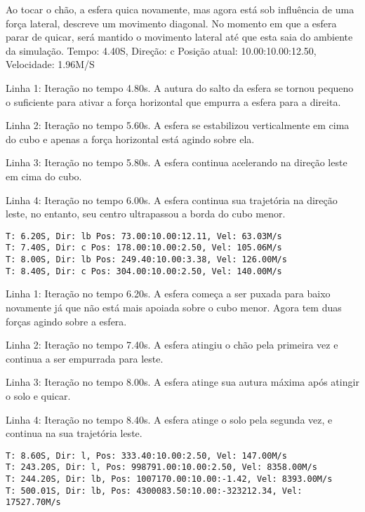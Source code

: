 \documentclass[12pt]{article}
\begin{document}
Ao tocar o chão, a esfera quica novamente, mas agora está sob influência de uma força lateral, descreve um movimento diagonal. No momento em que a esfera parar de quicar, será mantido o movimento lateral até que esta saia do ambiente da simulação.
 Tempo: 4.40S, Direção: c
Posição atual: 10.00:10.00:12.50, Velocidade: 1.96M/S


Linha 1: Iteração no tempo 4.80s. A autura do salto da esfera se tornou pequeno o suficiente para ativar a força horizontal que empurra a esfera para a direita.

Linha 2: Iteração no tempo 5.60s. A esfera se estabilizou verticalmente em cima do cubo e apenas a força horizontal está agindo sobre ela.

Linha 3: Iteração no tempo 5.80s. A esfera continua acelerando  na direção leste em cima do cubo.

Linha 4: Iteração no tempo 6.00s. A esfera continua sua trajetória na direção leste, no entanto, seu centro ultrapassou a borda do cubo menor.

\begin{lstlisting}[frame=single,caption=Esfera se movendo diagonalmente\label{lg:esfera_m3}]
T: 6.20S, Dir: lb Pos: 73.00:10.00:12.11, Vel: 63.03M/s
T: 7.40S, Dir: c Pos: 178.00:10.00:2.50, Vel: 105.06M/s
T: 8.00S, Dir: lb Pos: 249.40:10.00:3.38, Vel: 126.00M/s
T: 8.40S, Dir: c Pos: 304.00:10.00:2.50, Vel: 140.00M/s
\end{lstlisting}

Linha 1: Iteração no tempo 6.20s. A esfera começa a ser puxada para baixo novamente já que não está mais apoiada sobre o cubo menor. Agora tem duas forças agindo sobre a esfera.

Linha 2: Iteração no tempo 7.40s. A esfera atingiu o chão pela primeira vez e continua a ser empurrada para leste.

Linha 3: Iteração no tempo 8.00s. A esfera atinge sua autura máxima após atingir o solo e quicar.

Linha 4: Iteração no tempo 8.40s. A esfera atinge o solo pela segunda vez, e continua na sua trajetória leste.

\begin{lstlisting}[frame=single,caption=Esfera sobre o chão e saída do ambiente\label{lg:esferaM4}]
T: 8.60S, Dir: l, Pos: 333.40:10.00:2.50, Vel: 147.00M/s
T: 243.20S, Dir: l, Pos: 998791.00:10.00:2.50, Vel: 8358.00M/s
T: 244.20S, Dir: lb, Pos: 1007170.00:10.00:-1.42, Vel: 8393.00M/s
T: 500.01S, Dir: lb, Pos: 4300083.50:10.00:-323212.34, Vel: 17527.70M/s
\end{lstlisting}
\end{document}
